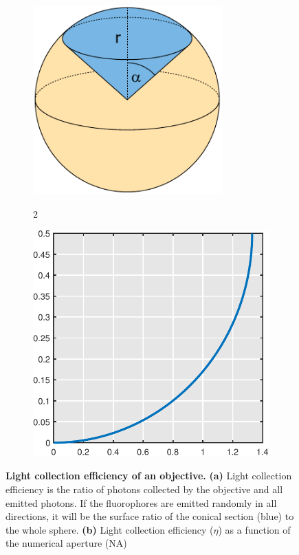 \documentclass{diploma_style}
\begin{document}
\begin{figure}[tpb]
\begin{subfigure}[t]{0.49\textwidth}
    \centering
    \includegraphics[page=1,width=0.8\textwidth]{figures/2_DualMouse/efficiency/sphere}
    \caption{\textbf{}}
    \label{fig:light_effa}2
\end{subfigure}
\begin{subfigure}[t]{0.49\textwidth}
    \centering
    \includegraphics[page=1,width=1\textwidth]{figures/2_DualMouse/efficiency/light_eff}
    \caption{\textbf{}}
    \label{fig:light_effb}
\end{subfigure} 
 \caption{\textbf{Light collection efficiency of an objective.} \textbf{(a)} Light collection efficiency is the ratio of photons collected by the objective and all emitted photons. If the fluorophores are emitted randomly in all directions, it will be the surface ratio of the conical section (blue) to the whole sphere. \textbf{(b)} Light collection efficiency ($\eta$) as a function of the numerical aperture (NA)}
 \label{fig:light_eff}
\end{figure}
\end{document}
